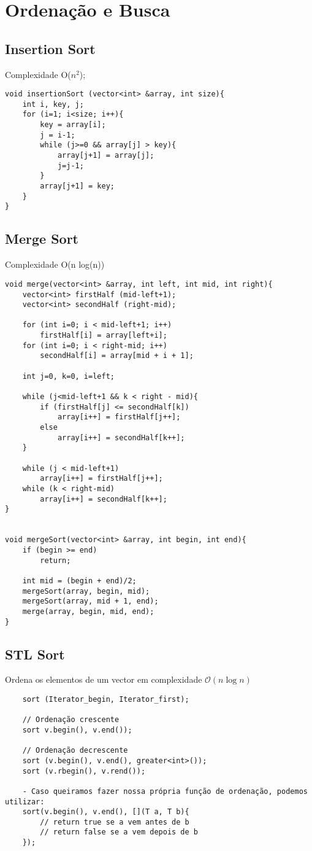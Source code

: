 \section{Ordenação e Busca}

\subsection{Insertion Sort}
Complexidade O($n^2$);
\begin{verbatim}
void insertionSort (vector<int> &array, int size){
    int i, key, j;
    for (i=1; i<size; i++){
        key = array[i];
        j = i-1;
        while (j>=0 && array[j] > key){
            array[j+1] = array[j];
            j=j-1;
        }
        array[j+1] = key;
    }
}
\end{verbatim}

\subsection{Merge Sort}
Complexidade O(n log(n))
\begin{verbatim}
void merge(vector<int> &array, int left, int mid, int right){
    vector<int> firstHalf (mid-left+1);
    vector<int> secondHalf (right-mid);
 
    for (int i=0; i < mid-left+1; i++)  
        firstHalf[i] = array[left+i];
    for (int i=0; i < right-mid; i++)
        secondHalf[i] = array[mid + i + 1];

    int j=0, k=0, i=left; 

    while (j<mid-left+1 && k < right - mid){
        if (firstHalf[j] <= secondHalf[k])
            array[i++] = firstHalf[j++];
        else
            array[i++] = secondHalf[k++];
    }

    while (j < mid-left+1)
        array[i++] = firstHalf[j++];
    while (k < right-mid)
        array[i++] = secondHalf[k++];
}
 

void mergeSort(vector<int> &array, int begin, int end){
    if (begin >= end)
        return;
 
    int mid = (begin + end)/2;
    mergeSort(array, begin, mid);
    mergeSort(array, mid + 1, end);
    merge(array, begin, mid, end);
}
\end{verbatim}

\subsection{STL Sort}
    Ordena os elementos de um vector em complexidade $\mathcal{O}(n\log n)$
\begin{verbatim}
    sort (Iterator_begin, Iterator_first);
    
    // Ordenação crescente
    sort v.begin(), v.end());

    // Ordenação decrescente
    sort (v.begin(), v.end(), greater<int>());
    sort (v.rbegin(), v.rend());

    - Caso queiramos fazer nossa própria função de ordenação, podemos utilizar:
    sort(v.begin(), v.end(), [](T a, T b){
        // return true se a vem antes de b
        // return false se a vem depois de b
    });

\end{verbatim}

